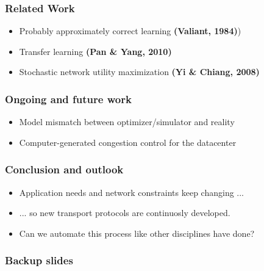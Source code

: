 \documentclass[svgnames]{beamer}
\begin{document}
\begin{Large}













\begin{frame}
\frametitle{Related Work}
\begin{itemize}
\item Probably approximately correct learning \textbf{(Valiant, 1984)})
\item Transfer learning \textbf{(Pan \& Yang, 2010)}
\item Stochastic network utility maximization \textbf{(Yi \& Chiang, 2008)}
\end{itemize}
\end{frame}

\begin{frame}
\frametitle{Ongoing and future work}
\begin{itemize}
\item<1-> Model mismatch between optimizer/simulator and reality
\item<2-> Computer-generated congestion control for the datacenter
\end{itemize}
\end{frame}

\begin{frame}
\frametitle{Conclusion and outlook}
\begin{itemize}
\item<1-> Application needs and network constraints keep changing ...
\item<2-> ... so new transport protocols are continuosly developed.
\item<3-> Can we automate this process like other disciplines have done?
\end{itemize}
\end{frame}

\end{Large}

\begin{frame}
\frametitle{Backup slides}
\end{frame}

\end{document}
